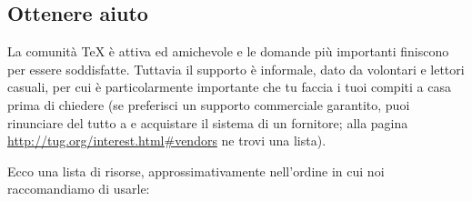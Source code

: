 \documentclass{article}
\begin{document}
\subsection{Ottenere aiuto}
\label{sec:help}

La comunità \TeX{} è attiva ed amichevole e le domande più importanti
finiscono per essere soddisfatte. Tuttavia il supporto è informale, dato
da volontari e lettori casuali, per cui è particolarmente importante che
tu faccia i tuoi compiti a casa prima di chiedere (se preferisci un
supporto commerciale garantito, puoi rinunciare del tutto a \TL{} e
acquistare il sistema di un fornitore; alla pagina
\url{http://tug.org/interest.html#vendors} ne trovi una lista).

Ecco una lista di risorse, approssimativamente nell'ordine in cui noi
raccomandiamo di usarle:
\end{document}
